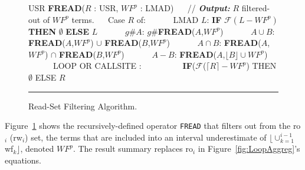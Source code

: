 \documentclass{sig-alternate}
\begin{document}
\begin{figure}[t]
\begin{scriptsize}
USR {\bf FREAD}($R$ : USR, $WF^p$ : LMAD) \vspace{1ex} \newline
$\mbox{ }\mbox{ }$// {\bf {\em Output:}} $R$ filtered-out of $WF^p$ terms. \vspace{1ex} \newline
$\mbox{ }\mbox{ }$Case $R$ of: \vspace{1ex} \newline
$\mbox{ }\mbox{ }\mbox{ }\mbox{ }$ LMAD $L$: %
{\bf IF} $\mathcal{F}(L - WF^p)$ {\bf THEN} $\emptyset$ {\bf ELSE} $L$ \vspace{1ex} \newline
$\mbox{ }\mbox{ }\mbox{ }\mbox{ }$ $g\#A$: $g\#${\bf FREAD}($A$,$WF^p$)  \vspace{1ex} \newline   
$\mbox{ }\mbox{ }\mbox{ }\mbox{ }$ $A \cup B$: {\bf FREAD}($A$,$WF^p$) $\cup$ {\bf FREAD}($B$,$WF^p$) \vspace{1ex} \newline
$\mbox{ }\mbox{ }\mbox{ }\mbox{ }$ $A \cap B$: {\bf FREAD}($A$,$WF^p$) $\cap$ {\bf FREAD}($B$,$WF^p$) \vspace{1ex} \newline
$\mbox{ }\mbox{ }\mbox{ }\mbox{ }$ $A - B$: {\bf FREAD}($A$,$\lfloor B \rfloor \cup WF^p$)   \vspace{1ex} \newline
$\mbox{ }\mbox{ }\mbox{ }\mbox{ }$ LOOP OR CALLSITE :   \vspace{1ex} \newline   
$\mbox{ }\mbox{ }\mbox{ }$ 
$\mbox{ }\mbox{ }\mbox{ }$ 
          {\bf IF}($\mathcal{F}$($\lceil R \rceil - WF^p$) THEN $\emptyset$ ELSE $R$
\end{scriptsize}
\hrule
\caption{ Read-Set Filtering Algorithm.}
\label{fig:ReadFilt} %
\end{figure}
 

Figure~\ref{fig:ReadFilt} shows the recursively-defined operator {\tt FREAD} that
filters out from the {\sc ro}$_i$ ({\sc rw}$_i$) set, the terms that are included 
into an interval underestimate of $\lfloor\cup_{k=1}^{i-1}${\sc wf}$_k\rfloor$, 
denoted $WF^p$.
The result summary replaces {\sc ro}$_i$ in Figure~\ref{fig:LoopAggreg}'s equations.
\end{document}
